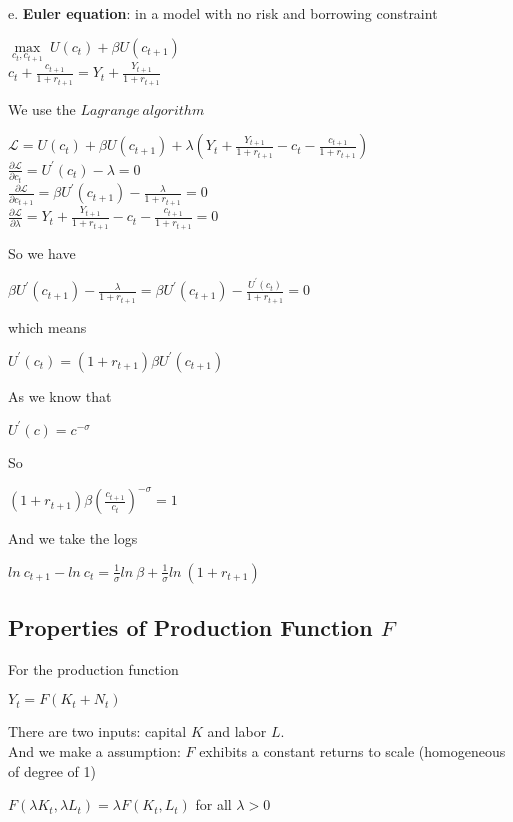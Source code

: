 \documentclass{article}
\begin{document}
e. \textbf{Euler equation}: in a model with no risk and borrowing constraint
\begin{center}
	$\mathop{max}\limits_{c_t, c_{t+1}}\ U(c_t) + \beta U(c_{t+1})$\\
	$c_t + \frac{c_{t+1}}{1 + r_{t+1}} = Y_t + \frac{Y_{t+1}}{1 + r_{t+1}}$
\end{center}
We use the $Lagrange\ algorithm$
\begin{center}
$\mathscr{L} = U(c_t) + \beta U(c_{t+1}) + \lambda(Y_t + \frac{Y_{t+1}}{1 + r_{t+1}} - c_t - \frac{c_{t+1}}{1 + r_{t+1}})$\\
$\frac{\partial \mathscr{L}}{\partial c_t} = U^\prime(c_t) - \lambda = 0$\\
$\frac{\partial \mathscr{L}}{\partial c_{t+1}} = \beta U^\prime(c_{t+1}) - \frac{\lambda}{1 + r_{t+1}} = 0$\\
$\frac{\partial \mathscr{L}}{\partial \lambda} = Y_t + \frac{Y_{t+1}}{1 + r_{t+1}} - c_t - \frac{c_{t+1}}{1 + r_{t+1}} = 0$\\
\end{center}
So we have\\
\centerline{$\beta U^\prime(c_{t+1}) - \frac{\lambda}{1 + r_{t+1}} = \beta U^\prime(c_{t+1}) - \frac{U^\prime(c_t)}{1 + r_{t+1}} = 0$}
which means\\
\centerline{$U^\prime(c_t) = (1 + r_{t+1})\beta U^\prime(c_{t+1})$}
As we know that\\
\centerline{$U^\prime(c) = c^{-\sigma}$}
So\\
\centerline{$(1 + r_{t+1})\beta (\frac{c_{t+1}}{c_{t}})^{-\sigma} = 1$}
And we take the logs\\
\centerline{$ln\ c_{t+1} - ln\ c_{t} = \frac{1}{\sigma}ln\ \beta + \frac{1}{\sigma}ln\ (1 + r_{t+1})$}


\subsection{Properties of Production Function $F$}
For the production function\\
\centerline{$Y_t = F(K_t + N_t)$}
There are two inputs: capital $K$ and labor $L$.\\
 And we make a assumption: $F$ exhibits a constant returns to scale (homogeneous of degree of 1)\\
\centerline{$F(\lambda K_t, \lambda L_t) = \lambda F(K_t, L_t)$ for all $\lambda > 0$}
\end{document}
